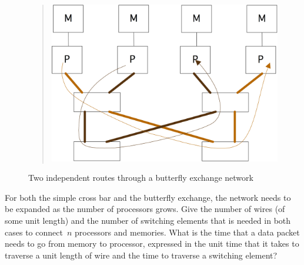 \begin{figure}[ht]
  \begin{quote}
  \includegraphics[scale=.1]{graphics/butterfly3}
  \end{quote}
  \caption{Two independent routes through a butterfly exchange network}
  \label{fig:butterflyroute}
\end{figure}

\begin{exercise}
For both the simple cross bar and the butterfly
exchange, the network needs to be expanded as the number of processors grows. 
Give the number of wires (of some unit length) and the number of switching
elements that is needed in both cases to connect~$n$ processors and memories. 
What is the time that a data packet needs to go from memory to processor,
expressed in the unit time that it takes to traverse a unit length of wire
and the time to traverse a switching element?
\end{exercise}

